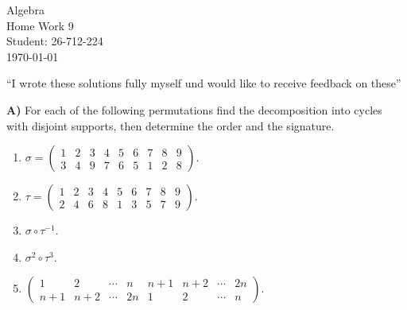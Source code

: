 \documentclass[12pt,a4paper]{article}
\begin{document}
\begin{titlepage}
\centering
\vspace*{\fill}
{\Huge Algebra}\\[0.5cm]
{\Huge Home Work 9}\\[1.5cm]
{\Large Student: 26-712-224}\\[0.5cm]
{\Large \today}\par
\vspace{2cm}
{\normalsize ``I wrote these solutions fully myself und would like to receive feedback on these''\par}
\vspace*{\fill}
\end{titlepage}
\noindent\textbf{A)} For each of the following permutations find the decomposition into cycles with disjoint supports, then determine the order and the signature.
\begin{enumerate}
\renewcommand{\labelenumi}{(\arabic{enumi})}
\item $\sigma=\begin{pmatrix}
1&2&3&4&5&6&7&8&9\\
3&4&9&7&6&5&1&2&8
\end{pmatrix}$.
\item $\tau=\begin{pmatrix}
1&2&3&4&5&6&7&8&9\\
2&4&6&8&1&3&5&7&9
\end{pmatrix}$.
\item $\sigma\circ\tau^{-1}$.
\item $\sigma^2\circ\tau^3$.
\item $\begin{pmatrix}
1&2&\cdots&n&n+1&n+2&\cdots&2n\\
n+1&n+2&\cdots&2n&1&2&\cdots&n
\end{pmatrix}$.
\end{enumerate}
\end{document}
